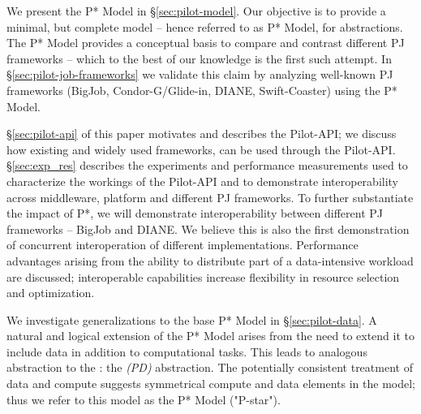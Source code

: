 \documentclass{sig-alternate}
\begin{document}


We present the P* Model in \S\ref{sec:pilot-model}. Our objective is to provide
a minimal, but complete model -- hence referred to as P* Model, for \pilotjob
abstractions. The P* Model provides a conceptual basis to compare and contrast
different PJ frameworks -- which to the best of our knowledge is the first such
attempt. In \S\ref{sec:pilot-job-frameworks} we validate this claim by analyzing
well-known PJ frameworks (BigJob, Condor-G/Glide-in, DIANE, Swift-Coaster) using
the P* Model.



\S\ref{sec:pilot-api} of this paper motivates and describes the Pilot-API;  we
discuss how %
existing and widely used \pilotjob frameworks, can be used through the
Pilot-API.  \S\ref{sec:exp_res} describes the experiments and performance
measurements used to characterize the workings of the Pilot-API and to
demonstrate interoperability across middleware, platform and different
PJ frameworks.  To further substantiate the impact of P*, we will
demonstrate interoperability between different PJ frameworks -- BigJob
and DIANE. We believe this is also the first demonstration of
concurrent interoperation of different \pilotjob implementations.
Performance advantages arising from the ability to distribute part of a
data-intensive workload are discussed; interoperable capabilities
increase flexibility in resource selection and optimization.

We investigate generalizations to the base P* Model
in \S\ref{sec:pilot-data}.  A natural and logical extension of the
P* Model arises from the need to extend it to include data in
addition to computational tasks.  This leads to analogous abstraction
to the \pilotjob: the \emph{\pilotdata (PD)} abstraction.  The
potentially consistent treatment of data and compute suggests
symmetrical compute and data elements in the model; thus we refer
to this model as the P* Model ("P-star").
\end{document}
